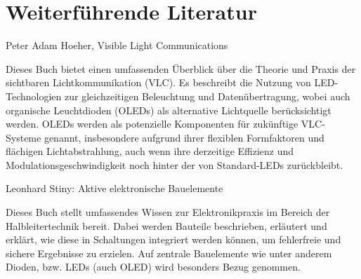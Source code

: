 \section{Weiterführende Literatur}

Peter Adam Hoeher, Visible Light Communications \cite{Hoeher:2019}

\medskip

Dieses Buch bietet einen umfassenden Überblick über die Theorie und Praxis der sichtbaren Lichtkommunikation (VLC). Es beschreibt die Nutzung von LED-Technologien zur gleichzeitigen Beleuchtung und Datenübertragung, wobei auch organische Leuchtdioden (OLEDs) als alternative Lichtquelle berücksichtigt werden. OLEDs werden als potenzielle Komponenten für zukünftige VLC-Systeme genannt, insbesondere aufgrund ihrer flexiblen Formfaktoren und flächigen Lichtabstrahlung, auch wenn ihre derzeitige Effizienz und Modulationsgeschwindigkeit noch hinter der von Standard-LEDs zurückbleibt.\\

\bigskip

Leonhard Stiny: Aktive elektronische Bauelemente \cite{Stiny:2019}

\medskip

Dieses Buch stellt umfassendes Wissen zur Elektronikpraxis im Bereich der Halbleitertechnik bereit. Dabei werden Bauteile beschrieben, erläutert und erklärt, wie diese in Schaltungen integriert werden können, um fehlerfreie und sichere Ergebnisse zu erzielen. Auf zentrale Bauelemente wie unter anderem Dioden, bzw. LEDs (auch OLED) wird besonders Bezug genommen.